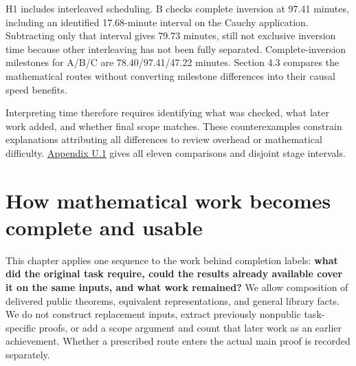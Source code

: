 H1 includes interleaved scheduling. B checks complete inversion at 97.41 minutes, including an identified 17.68-minute interval on the Cauchy application. Subtracting only that interval gives 79.73 minutes, still not exclusive inversion time because other interleaving has not been fully separated. Complete-inversion milestones for A/B/C are 78.40/97.41/47.22 minutes. Section 4.3 compares the mathematical routes without converting milestone differences into their causal speed benefits.

Interpreting time therefore requires identifying what was checked, what later work added, and whether final scope matches. These counterexamples constrain explanations attributing all differences to review overhead or mathematical difficulty. \href{en-appendix.pdf\#u1}{Appendix U.1} gives all eleven comparisons and disjoint stage intervals.

\section[How mathematical work becomes complete and usable]{\texorpdfstring{\protect\hypertarget{section-4}{}How mathematical work becomes complete and usable}{How mathematical work becomes complete and usable}}
This chapter applies one sequence to the work behind completion labels: \textbf{what did the original task require, could the results already available cover it on the same inputs, and what work remained?} We allow composition of delivered public theorems, equivalent representations, and general library facts. We do not construct replacement inputs, extract previously nonpublic task-specific proofs, or add a scope argument and count that later work as an earlier achievement. Whether a prescribed route enters the actual main proof is recorded separately.

